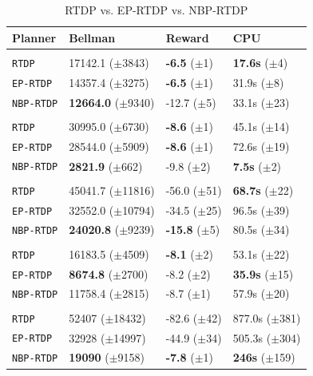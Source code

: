 \documentclass[11pt]{article}
\begin{document}
\begin{table}
\centering
{}
\small
\begin{tabular}{@{}llll@{}}\toprule
Planner & Bellman & Reward & CPU \\ \midrule
&\hspace{-10mm}{\it Mining Task} \\
\texttt{RTDP} & 17142.1 ($\pm$3843) 		& {\bf -6.5} ($\pm$1)  & {\bf 17.6s}   ($\pm$4) \\
\texttt{EP-RTDP} 	& 14357.4 ($\pm$3275) 		& {\bf -6.5}   ($\pm$1) & 31.9s   ($\pm$8) \\
\texttt{NBP-RTDP} 	& {\bf 12664.0} ($\pm$9340) 	& -12.7 ($\pm$5) & 33.1s   ($\pm$23) \\\hline
&\hspace{-10mm}{\it Smelting Task} \\
\texttt{RTDP} 	& 30995.0 ($\pm$6730) 		& {\bf -8.6}   ($\pm$1) & 45.1s   ($\pm$14) \\
\texttt{EP-RTDP} 	& 28544.0 ($\pm$5909) 		& {\bf -8.6}   ($\pm$1) & 72.6s   ($\pm$19) \\ 
\texttt{NBP-RTDP} 	& {\bf 2821.9} 	 ($\pm$662) 	& -9.8   ($\pm$2) & {\bf 7.5s}  ($\pm$2) \\ \hline
&\hspace{-10mm}{\it Wall Traversal Task} \\
\texttt{RTDP} & 45041.7 ($\pm$11816) 		& -56.0   ($\pm$51) & {\bf 68.7s}   ($\pm$22) \\
\texttt{EP-RTDP} 	& 32552.0 ($\pm$10794) 		& -34.5   ($\pm$25) & 96.5s   ($\pm$39) \\ 
\texttt{NBP-RTDP} 	& {\bf 24020.8} ($\pm$9239) 	& {\bf -15.8}   ($\pm$5) & 80.5s   ($\pm$34) \\ \hline
&\hspace{-10mm}{\it Trench Traversal Task} \\
\texttt{RTDP}  	& 16183.5 ($\pm$4509) 		& {\bf -8.1}   ($\pm$2) & 53.1s   ($\pm$22) \\
\texttt{EP-RTDP} 	& {\bf 8674.8} 	($\pm$2700) 	& -8.2   ($\pm$2) & {\bf 35.9s}   ($\pm$15) \\ 
\texttt{NBP-RTDP} 	& 11758.4 ($\pm$2815) 		& -8.7   ($\pm$1) & 57.9s   ($\pm$20) \\ \hline
&\hspace{-10mm}{\it Plane Traversal Task} \\
\texttt{RTDP} & 52407 ($\pm$18432) 		& -82.6   ($\pm$42) & 877.0s   ($\pm$381) \\
\texttt{EP-RTDP} 	& 32928 ($\pm$14997) 		& -44.9   ($\pm$34) & 505.3s   ($\pm$304) \\
\texttt{NBP-RTDP} 	& {\bf 19090} 	 ($\pm$9158) 	& {\bf-7.8}   ($\pm$1) & {\bf 246s}  ($\pm$159) \\
\bottomrule
\end{tabular}
\caption{RTDP vs. EP-RTDP vs. NBP-RTDP}
\label{table:minecraft_results}
\end{table}
\end{document}
